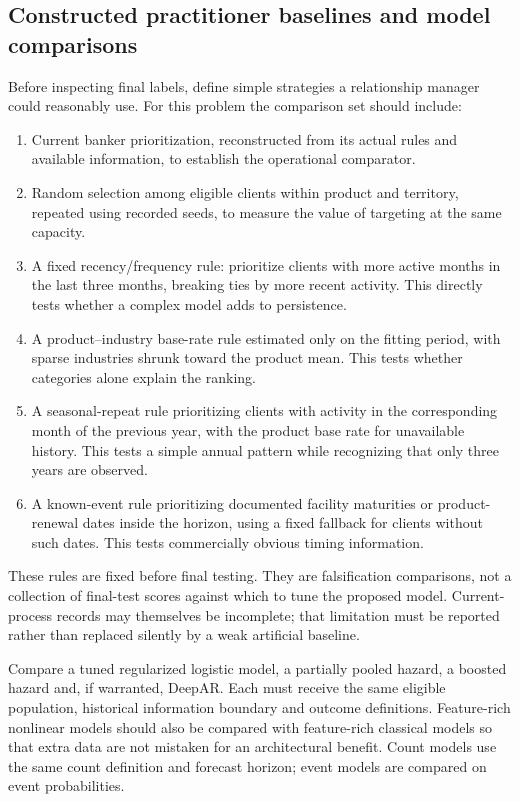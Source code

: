 \subsection{Constructed practitioner baselines and model comparisons}

Before inspecting final labels, define simple strategies a relationship manager could reasonably use. For this problem the comparison set should include:
\begin{enumerate}[leftmargin=*]
 \item Current banker prioritization, reconstructed from its actual rules and available information, to establish the operational comparator.
 \item Random selection among eligible clients within product and territory, repeated using recorded seeds, to measure the value of targeting at the same capacity.
 \item A fixed recency/frequency rule: prioritize clients with more active months in the last three months, breaking ties by more recent activity. This directly tests whether a complex model adds to persistence.
 \item A product--industry base-rate rule estimated only on the fitting period, with sparse industries shrunk toward the product mean. This tests whether categories alone explain the ranking.
 \item A seasonal-repeat rule prioritizing clients with activity in the corresponding month of the previous year, with the product base rate for unavailable history. This tests a simple annual pattern while recognizing that only three years are observed.
 \item A known-event rule prioritizing documented facility maturities or product-renewal dates inside the horizon, using a fixed fallback for clients without such dates. This tests commercially obvious timing information.
\end{enumerate}
These rules are fixed before final testing. They are falsification comparisons, not a collection of final-test scores against which to tune the proposed model. Current-process records may themselves be incomplete; that limitation must be reported rather than replaced silently by a weak artificial baseline.

Compare a tuned regularized logistic model, a partially pooled hazard, a boosted hazard and, if warranted, DeepAR. Each must receive the same eligible population, historical information boundary and outcome definitions. Feature-rich nonlinear models should also be compared with feature-rich classical models so that extra data are not mistaken for an architectural benefit. Count models use the same count definition and forecast horizon; event models are compared on event probabilities.

